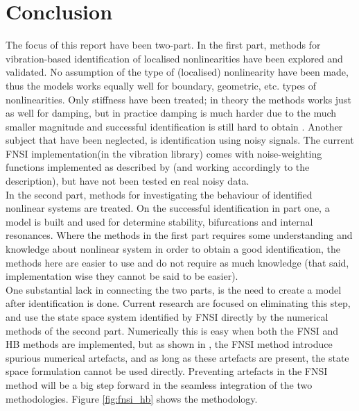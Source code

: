 \chapter{Conclusion}
\label{cha:conclusion}

The focus of this report have been two-part. In the first part, methods for
vibration-based identification of localised nonlinearities have been explored and
validated. No assumption of the type of (localised) nonlinearity have been made, thus the
models works equally well for boundary, geometric, etc. types of nonlinearities.
Only stiffness have been treated; in theory the methods works just as well for
damping, but in practice damping is much harder due to the much smaller
magnitude and successful identification is still hard to obtain \autocite{noel2013a}.
Another subject that have been neglected, is identification using noisy
signals. The current FNSI implementation(in the vibration library) comes with
noise-weighting functions implemented as described by \autocite{noel2013a}(and
working accordingly to the description), but have not been tested en real noisy data.\\

In the second part, methods for investigating the behaviour of identified
nonlinear systems are treated. On the successful identification in part one, a
model is built and used for determine stability, bifurcations and internal
resonances. Where the methods in the first part requires some understanding and
knowledge about nonlinear system in order to obtain a good identification, the
methods here are easier to use and do not require as much knowledge (that said,
implementation wise they cannot be said to be easier).\\

One substantial lack in connecting the two parts, is the need to create a model
after identification is done. Current research are focused on eliminating this
step, and use the state space system identified by FNSI directly by the
numerical methods of the second part. Numerically this is
easy when both the FNSI and HB methods are implemented, but as shown in
\autocite{gourc2016a}, the FNSI method introduce spurious numerical
artefacts, and as long as these artefacts are present, the state space
formulation cannot be used directly. Preventing artefacts in the FNSI method
will be a big step forward in the seamless integration of the two methodologies.
Figure \ref{fig:fnsi_hb} shows the methodology.

